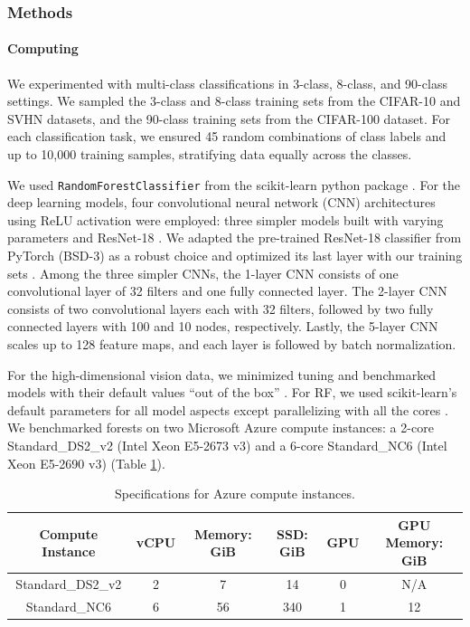 \subsubsection{Methods}
\paragraph{Computing}
We experimented with multi-class classifications in 3-class, 8-class, and 90-class settings. We sampled the 3-class and 8-class training sets from the CIFAR-10 and SVHN datasets, and the 90-class training sets from the CIFAR-100 dataset. For each classification task, we ensured 45 random combinations of class labels and up to 10,000 training samples, stratifying data equally across the classes.

We used \texttt{RandomForestClassifier} from the scikit-learn python package \citep{scikit-learn}. For the deep learning models, four convolutional neural network (CNN) architectures using ReLU activation were employed: three simpler models built with varying parameters and ResNet-18 \citep{Priebe2020.04.29.068460, resnet}. We adapted the pre-trained ResNet-18 classifier from PyTorch (BSD-3) as a robust choice and optimized its last layer with our training sets \citep{pytorch}. Among the three simpler CNNs, the 1-layer CNN consists of one convolutional layer of 32 filters and one fully connected layer. The 2-layer CNN consists of two convolutional layers each with 32 filters, followed by two fully connected layers with 100 and 10 nodes, respectively. Lastly, the 5-layer CNN scales up to 128 feature maps, and each layer is followed by batch normalization.

For the high-dimensional vision data, we minimized tuning and benchmarked models with their default values ``out of the box'' \citep{Probst2019hy}. For RF, we used scikit-learn's default parameters for all model aspects except parallelizing with all the cores \citep{scikit-learn}. We benchmarked forests on two Microsoft Azure compute instances: a 2-core Standard\_DS2\_v2 (Intel Xeon E5-2673 v3) and a 6-core Standard\_NC6 (Intel Xeon E5-2690 v3) (Table \ref{table:azure}).

\begin{table}[htb]
\centering
\begin{tabular}{ |c|c|c|c|c|c| } 
\hline
Compute Instance & vCPU & Memory: GiB & SSD: GiB & GPU & GPU Memory: GiB \\
\hline
Standard\_DS2\_v2 & 2 & 7 & 14 & 0 & N/A \\
\hline
Standard\_NC6 & 6 & 56 & 340 & 1 & 12 \\
\hline
\end{tabular}
\caption{Specifications for Azure compute instances.}
\label{table:azure}
\end{table}

